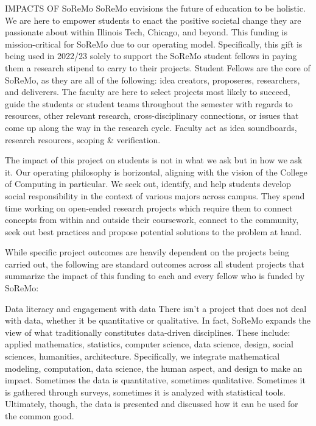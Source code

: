 \documentclass[11pt]{NSFamsart}
\begin{document}
{\color{magenta}IMPACTS OF SoReMo}
SoReMo envisions the future of education to be holistic. We are here to empower students to enact the positive societal change they are passionate about within Illinois Tech, Chicago, and beyond. This funding is mission-critical for SoReMo due to our operating model. 
Specifically, this gift is being used in 2022/23 solely to support the SoReMo student fellows in paying them a research stipend to carry to their projects. Student Fellows are the core of SoReMo, as they are all of the following: idea creators, proposeres, researchers, and deliverers. The faculty are here to select projects most likely to succeed, guide the students or student teams throughout the semester with regards to resources, other relevant research, cross-disciplinary connections, or issues that come up along the way in the research cycle. Faculty act as idea soundboards, research resources, scoping \& verification. 

The impact of this project on students is not in what we ask but in how we ask it. 
Our operating philosophy is horizontal, aligning with the vision of the College of Computing in particular. We seek out, identify, and help students develop social responsibility in the context of various majors across campus. They spend time working on open-ended research projects which require them to connect concepts from within and outside their coursework, connect to the community, seek out best practices and propose potential solutions to the problem at hand. 

While specific project outcomes are heavily dependent on the projects being carried out, the following are standard outcomes across all student projects that summarize the impact of this funding to each and every fellow who is funded by SoReMo: 

Data literacy and engagement with data
There isn’t a project that does not deal with data, whether it be quantitative or qualitative. In fact, SoReMo expands the view of what traditionally constitutes data-driven disciplines. These include: applied mathematics, statistics, computer science, data science, design, social sciences, humanities, architecture. Specifically, we integrate mathematical modeling, computation, data science, the human aspect, and design to make an impact. Sometimes the data is quantitative, sometimes qualitative. Sometimes it is gathered through surveys, sometimes it is analyzed with statistical tools. Ultimately, though, the data is presented and discussed how it can be used for the common good. 
\end{document}
